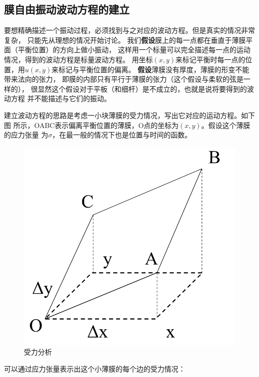 \documentclass[a4paper]{ctexart}
\begin{document}
	\subsection{膜自由振动波动方程的建立}
	要想精确描述一个振动过程，必须找到与之对应的波动方程。但是真实的情况非常复杂，
	只能先从理想的情况开始讨论。
	我们\textbf{假设}膜上的每一点都在垂直于薄膜平面（平衡位置）的方向上做小振动，
	这样用一个标量可以完全描述每一点的运动情况，得到的波动方程是标量波动方程。
	用坐标$(x, y)$来标记平衡时每一点的位置，用$u(x, y)$来标记与平衡位置的偏离。
	\textbf{假设}薄膜没有厚度，薄膜的形变不能带来法向的张力，
	即膜的内部只有平行于薄膜的张力（这个假设与柔软的弦是一样的），
	很显然这个假设对于平板（和细杆）是不成立的，也就是说将要得到的波动方程
	并不能描述与它们的振动。
	\par 建立波动方程的思路是考虑一小块薄膜的受力情况，写出它对应的运动方程。如下图
	所示，OABC表示偏离平衡位置的薄膜，O点的坐标为$(x, y)$。假设这个薄膜的应力张量
	为$\sigma$，在最一般的情况下也是位置与时间的函数。
	\begin{figure}[htbp]
		\centering
		\includegraphics[scale=0.2]{force.png}
		\caption{受力分析}
	\end{figure} 
	可以通过应力张量表示出这个小薄膜的每个边的受力情况：
\end{document}
